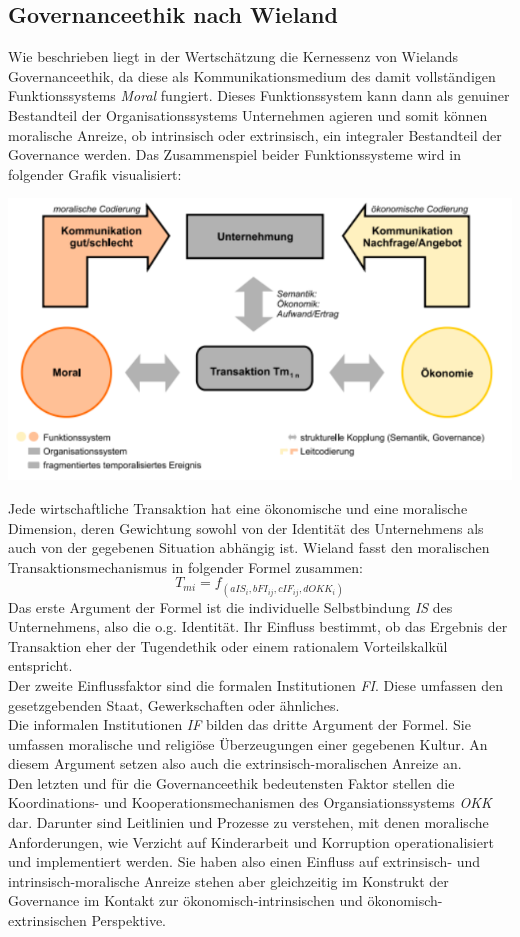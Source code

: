 \documentclass[12pt]{article}
\begin{document}
\subsection{Governanceethik nach Wieland}
Wie beschrieben liegt in der Wertschätzung die Kernessenz von Wielands Governanceethik, da diese als Kommunikationsmedium des damit vollständigen Funktionssystems \textit{Moral} fungiert. Dieses Funktionssystem kann dann als genuiner Bestandteil der Organisationssystems Unternehmen agieren und somit können moralische Anreize, ob intrinsisch oder extrinsisch, ein integraler Bestandteil der Governance werden. Das Zusammenspiel beider Funktionssysteme wird in folgender Grafik visualisiert:
\begin{center}
\includegraphics[width=.85\textwidth]{wieland1.png}
\end{center}
Jede wirtschaftliche Transaktion hat eine ökonomische und eine moralische Dimension, deren Gewichtung sowohl von der Identität des Unternehmens als auch von der gegebenen Situation abhängig ist. Wieland fasst den moralischen Transaktionsmechanismus in folgender Formel zusammen:
\[T_{mi}=f_{(aIS_i, bFI_{ij}, cIF_{ij}, dOKK_i)}\]
Das erste Argument der Formel ist die individuelle Selbstbindung \textit{IS} des Unternehmens, also die o.g. Identität. Ihr Einfluss bestimmt, ob das Ergebnis der Transaktion eher der Tugendethik oder einem rationalem Vorteilskalkül entspricht.\\
Der zweite Einflussfaktor sind die formalen Institutionen \textit{FI}. Diese umfassen den gesetzgebenden Staat, Gewerkschaften oder ähnliches.\\
Die informalen Institutionen \textit{IF} bilden das dritte Argument der Formel. Sie umfassen moralische und religiöse Überzeugungen einer gegebenen Kultur. An diesem Argument setzen also auch die extrinsisch-moralischen Anreize an.\\
Den letzten und für die Governanceethik bedeutensten Faktor stellen die Koordinations- und Kooperationsmechanismen des Organsiationssystems \textit{OKK} dar. Darunter sind Leitlinien und Prozesse zu verstehen, mit denen moralische Anforderungen, wie Verzicht auf Kinderarbeit und Korruption operationalisiert und implementiert werden. Sie haben also einen Einfluss auf extrinsisch- und intrinsisch-moralische Anreize stehen aber gleichzeitig im Konstrukt der Governance im Kontakt zur ökonomisch-intrinsischen und ökonomisch-extrinsischen Perspektive.\\
\end{document}

